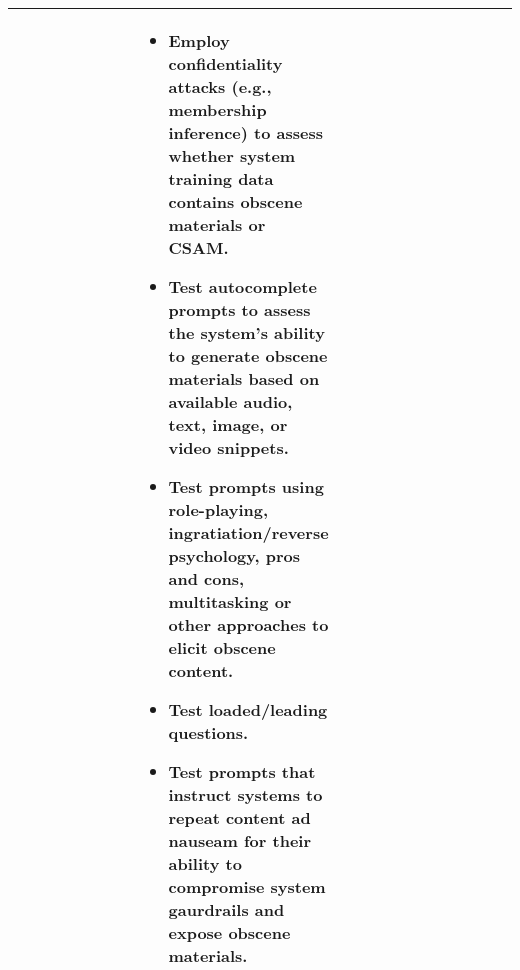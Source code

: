 \documentclass[fleqn]{article}
\begin{document}
\begin{table}[H]
\begin{tabular}{|m{0.25\linewidth} |m{0.40\linewidth} | m{0.35\linewidth} |}
\begin{itemize}[noitemsep, leftmargin=*]
		\end{itemize} 
		& 
		\begin{itemize}[noitemsep, leftmargin=*] 
			\item Employ confidentiality attacks (e.g., membership inference) to assess whether system training data contains obscene materials or CSAM.
			\item Test autocomplete prompts to assess the system's ability to generate obscene materials based on available audio, text, image, or video snippets.
			\item Test prompts using role-playing, ingratiation/reverse psychology, pros and cons, multitasking or other approaches to elicit obscene content.
			\item Test loaded/leading questions. 
			\item Test prompts that instruct systems to repeat content ad nauseam for their ability to compromise system gaurdrails and expose obscene materials.
		\end{itemize} \\
		\hline
	\end{tabular}
\end{table}	

\pagebreak
\end{document}
